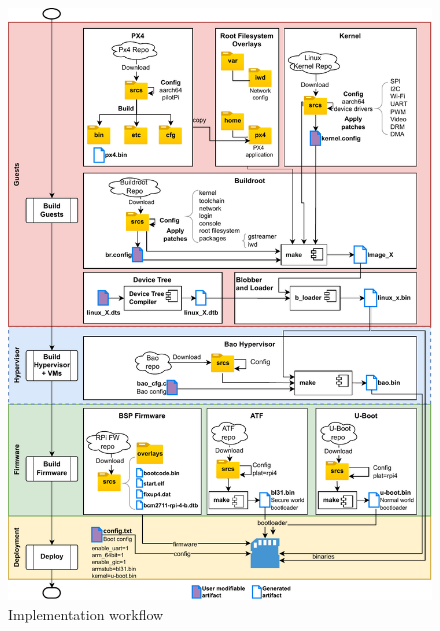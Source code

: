 \begin{figure}[!hbt]
  \centering
  \includegraphics[width=1.0\textwidth]{./img/pdf/uav-main-Implem-Workflow} 
  \caption{Implementation workflow}%
  \label{fig:uav-main-Implem-Workflow}
\end{figure}

